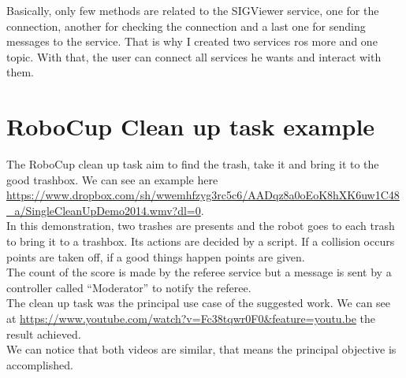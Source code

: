 \noindent\begin{minipage}{\linewidth}%
\label{fig:referee}%
\end{minipage}

Basically, only few methods are related to the SIGViewer service, one for the connection, another for checking the connection and a last one for sending messages to the service. That is why I created two services ros more and one topic. With that, the user can connect all services he wants and interact with them.

\section{RoboCup Clean up task example}
The RoboCup clean up task aim to find the trash, take it and bring it to the good trashbox. We can see an example here \url{https://www.dropbox.com/sh/wwemhfzyg3rc5c6/AADqz8a0oEoK8hXK6uw1C48_a/SingleCleanUpDemo2014.wmv?dl=0}.\\
In this demonstration, two trashes are presents and the robot goes to each trash to bring it to a trashbox. Its actions are decided by a script. If a collision occurs points are taken off, if a good things happen points are given.\\
The count of the score is made by the referee service but a message is sent by a controller called ``Moderator'' to notify the referee.\\
The clean up task was the principal use case of the suggested work. We can see at \url{https://www.youtube.com/watch?v=Fc38tqwr0F0&feature=youtu.be} the result achieved.\\
We can notice that both videos are similar, that means the principal objective is accomplished.\\

